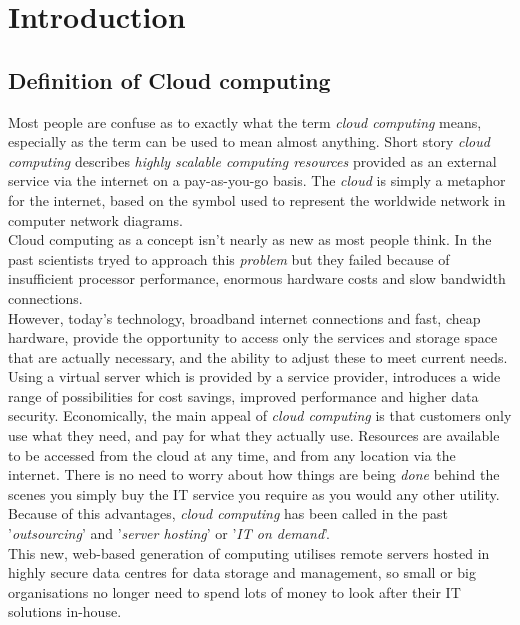 \chapter{Introduction}
\section{Definition of Cloud computing}
Most people are confuse as to exactly what the term \emph{cloud computing} means, especially as the term can be used to mean almost anything.
Short story \emph{cloud computing} describes \emph{highly scalable computing resources} provided as an external service via the internet
on a pay-as-you-go basis. The \emph{cloud} is simply a metaphor for the internet, based on the symbol used to represent the worldwide
network in computer network diagrams.\\[0.2cm]
Cloud computing as a concept isn't nearly as new as most people think. In the past scientists tryed to approach this \emph{problem} but 
they failed because of insufficient processor performance, enormous hardware costs and slow bandwidth connections.\\[0.2cm]
However, today's technology, broadband internet connections and fast, cheap hardware, provide the opportunity to access only the services
and storage space that are actually necessary, and the ability to adjust these to meet current needs. Using a virtual server which is 
provided by a service provider, introduces a wide range of possibilities for cost savings, improved performance and higher data security.
Economically, the main appeal of \emph{cloud computing} is that customers only use what they need, and pay for what they actually use.
Resources are available to be accessed from the cloud at any time, and from any location via the internet. There is no need to worry 
about how things are being \emph{done} behind the scenes you simply buy the IT service you require as you would any other utility.
Because of this advantages, \emph{cloud computing} has been called in the past '\emph{outsourcing}' and '\emph{server hosting}' or 
'\emph{IT on demand}'.\\[0.2cm]
This new, web-based generation of computing utilises remote servers hosted in highly secure data centres for data storage and management,
so small or big organisations no longer need to spend lots of money to look after their IT solutions in-house.\\[0.1cm]

\clearpage
